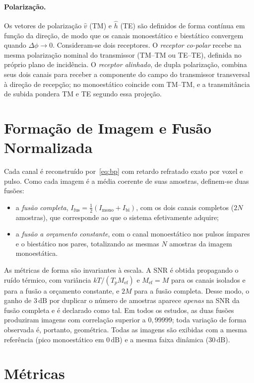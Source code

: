 \documentclass[12pt,a4paper,oneside]{book}
\theoremstyle{remark}
\newcommand{\dB}{\,\mathrm{dB}}
\theoremstyle{plain}
\theoremstyle{definition}
\begin{document}
\paragraph{Polarização.} Os vetores de polarização $\hat v$ (TM) e $\hat h$ (TE)
são definidos de forma contínua em função da direção, de modo que os canais
monoestático e biestático convergem quando $\Delta\phi\to0$. Consideram-se dois
receptores. O \emph{receptor co-polar} recebe na mesma polarização nominal do
transmissor (TM--TM ou TE--TE), definida no próprio plano de incidência. O
\emph{receptor alinhado}, de dupla polarização, combina seus dois canais para
receber a componente do campo do transmissor transversal à direção de
recepção; no monoestático coincide com TM--TM, e a transmitância de subida
pondera TM e TE segundo essa projeção.

\section{Formação de Imagem e Fusão Normalizada}
\label{sec:mod_fusao}

Cada canal é reconstruído por~\eqref{eq:bp} com retardo refratado exato por
voxel e pulso. Como cada imagem é a média coerente de suas amostras, definem-se
duas fusões:
\begin{itemize}
  \item a \emph{fusão completa}, $I_{\text{fus}}=\tfrac12(I_{\text{mono}}+I_{\text{bi}})$,
  com os dois canais completos ($2N$ amostras), que corresponde ao que o sistema
  efetivamente adquire;
  \item a \emph{fusão a orçamento constante}, com o canal monoestático nos pulsos
  ímpares e o biestático nos pares, totalizando as mesmas $N$ amostras da imagem
  monoestática.
\end{itemize}
As métricas de forma são invariantes à escala. A SNR é obtida propagando o ruído
térmico, com variância $kT/(T_pM_{\text{ef}})$ e $M_{\text{ef}}=M$ para os canais
isolados e para a fusão a orçamento constante, e $2M$ para a fusão completa.
Desse modo, o ganho de $3\dB$ por duplicar o número de amostras aparece
\emph{apenas} na SNR da fusão completa e é declarado como tal. Em todos os
estudos, as duas fusões produziram imagens com correlação superior a
$0,99999$; toda variação de forma observada é, portanto, geométrica. Todas as
imagens são exibidas com a mesma referência (pico monoestático em $0\dB$) e a
mesma faixa dinâmica ($30\dB$).

\section{Métricas}
\label{sec:mod_metricas}
\end{document}

